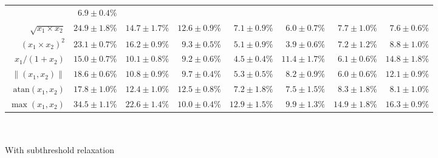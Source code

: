\begin{table}[t]
\begin{tabular}{r r r r r r r r }
	& \cellcolor{White!58!SteelBlue}$6.9 \pm 0.4\%$
	\\
	$\sqrt{x_1 \times x_2}$ 
	& \cellcolor{White!15!SteelBlue}$24.9 \pm 1.8\%$
	& \cellcolor{White!29!SteelBlue}$14.7 \pm 1.7\%$
	& \cellcolor{White!43!SteelBlue}$12.6 \pm 0.9\%$
	& \cellcolor{White!86!SteelBlue}$7.1 \pm 0.9\%$
	& \cellcolor{White!100!SteelBlue}$\mathbf{6.0 \pm 0.7\%}$
	& \cellcolor{White!58!SteelBlue}$7.7 \pm 1.0\%$
	& \cellcolor{White!72!SteelBlue}$7.6 \pm 0.6\%$
	\\
	$(x_1 \times x_2) ^ 2$ 
	& \cellcolor{White!15!SteelBlue}$23.1 \pm 0.7\%$
	& \cellcolor{White!29!SteelBlue}$16.2 \pm 0.9\%$
	& \cellcolor{White!43!SteelBlue}$9.3 \pm 0.5\%$
	& \cellcolor{White!86!SteelBlue}$5.1 \pm 0.9\%$
	& \cellcolor{White!100!SteelBlue}$\mathbf{3.9 \pm 0.6\%}$
	& \cellcolor{White!72!SteelBlue}$7.2 \pm 1.2\%$
	& \cellcolor{White!58!SteelBlue}$8.8 \pm 1.0\%$
	\\
	$x_1 / (1 + x_2)$ 
	& \cellcolor{White!15!SteelBlue}$15.0 \pm 0.7\%$
	& \cellcolor{White!58!SteelBlue}$10.1 \pm 0.8\%$
	& \cellcolor{White!72!SteelBlue}$9.2 \pm 0.6\%$
	& \cellcolor{White!100!SteelBlue}$\mathbf{4.5 \pm 0.4\%}$
	& \cellcolor{White!43!SteelBlue}$11.4 \pm 1.7\%$
	& \cellcolor{White!86!SteelBlue}$6.1 \pm 0.6\%$
	& \cellcolor{White!29!SteelBlue}$14.8 \pm 1.8\%$
	\\
	$\|(x_1, x_2)\|$ 
	& \cellcolor{White!15!SteelBlue}$18.6 \pm 0.6\%$
	& \cellcolor{White!43!SteelBlue}$10.8 \pm 0.9\%$
	& \cellcolor{White!58!SteelBlue}$9.7 \pm 0.4\%$
	& \cellcolor{White!100!SteelBlue}$\mathbf{5.3 \pm 0.5\%}$
	& \cellcolor{White!72!SteelBlue}$8.2 \pm 0.9\%$
	& \cellcolor{White!86!SteelBlue}$6.0 \pm 0.6\%$
	& \cellcolor{White!29!SteelBlue}$12.1 \pm 0.9\%$
	\\
	$\mathrm{atan}(x_1, x_2)$ 
	& \cellcolor{White!15!SteelBlue}$17.8 \pm 1.0\%$
	& \cellcolor{White!43!SteelBlue}$12.4 \pm 1.0\%$
	& \cellcolor{White!29!SteelBlue}$12.5 \pm 0.8\%$
	& \cellcolor{White!100!SteelBlue}$\mathbf{7.2 \pm 1.8\%}$
	& \cellcolor{White!86!SteelBlue}$7.5 \pm 1.5\%$
	& \cellcolor{White!58!SteelBlue}$8.3 \pm 1.8\%$
	& \cellcolor{White!72!SteelBlue}$8.1 \pm 1.0\%$
	\\
	$\max(x_1, x_2)$ 
	& \cellcolor{White!15!SteelBlue}$34.5 \pm 1.1\%$
	& \cellcolor{White!29!SteelBlue}$22.6 \pm 1.4\%$
	& \cellcolor{White!86!SteelBlue}$10.0 \pm 0.4\%$
	& \cellcolor{White!72!SteelBlue}$12.9 \pm 1.5\%$
	& \cellcolor{White!100!SteelBlue}$\mathbf{9.9 \pm 1.3\%}$
	& \cellcolor{White!58!SteelBlue}$14.9 \pm 1.8\%$
	& \cellcolor{White!43!SteelBlue}$16.3 \pm 0.9\%$
	\\
	\bottomrule
	\end{tabular}\\[0.25cm]
	\raggedright\textsuperscript{\dag}With subthreshold relaxation
	\label{tbl:function_approximations}
\end{table}

